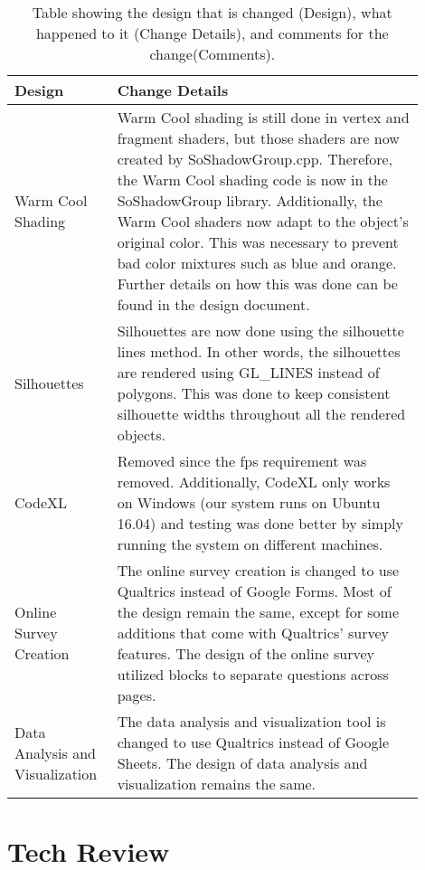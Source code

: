 \documentclass[10pt,journal,compsoc,draftclsnofoot]{IEEEtran}
\begin{document}
\begin{flushleft}
\begin{center}
\begin{table}[H]
\caption{Table showing the design that is changed (Design), what happened to it (Change Details), and comments for the change(Comments).}
\begin{tabular}{ | p{0.2\linewidth} | p{0.7\linewidth} | }
\hline
\textbf{Design}  & \textbf{Change Details} \\ \hline
Warm Cool Shading & 
Warm Cool shading is still done in vertex and fragment shaders, but those shaders are now created by SoShadowGroup.cpp. 
Therefore, the Warm Cool shading code is now in the SoShadowGroup library. 
Additionally, the Warm Cool shaders now adapt to the object's original color. 
This was necessary to prevent bad color mixtures such as blue and orange. 
Further details on how this was done can be found in the design document. \\ \hline
Silhouettes & Silhouettes are now done using the silhouette lines method. 
In other words, the silhouettes are rendered using GL\_LINES instead of polygons. 
This was done to keep consistent silhouette widths throughout all the rendered objects. \\ \hline
CodeXL & Removed since the fps requirement was removed. 
Additionally, CodeXL only works on Windows (our system runs on Ubuntu 16.04) and testing was done better by simply running the system on different machines. \\ \hline
Online Survey Creation & 
The online survey creation is changed to use Qualtrics instead of Google Forms.
Most of the design remain the same, except for some additions that come with Qualtrics' survey features.
The design of the online survey utilized blocks to separate questions across pages. \\ \hline
Data Analysis and Visualization & 
The data analysis and visualization tool is changed to use Qualtrics instead of Google Sheets.
The design of data analysis and visualization remains the same. \\ \hline
\end{tabular}
\newline
\label{table:DesignDocumentUpdate}
\end{table}
\end{center}

\newpage

\section{Tech Review}


\end{flushleft}
\end{document}
